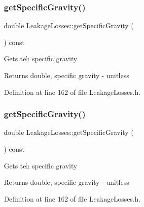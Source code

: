 \subsubsection{\texorpdfstring{get\+Specific\+Gravity()}{getSpecificGravity()}\hspace{0.1cm}{\footnotesize\ttfamily [1/3]}}
{\footnotesize\ttfamily double Leakage\+Losses\+::get\+Specific\+Gravity (\begin{DoxyParamCaption}{ }\end{DoxyParamCaption}) const\hspace{0.3cm}{\ttfamily [inline]}}

Gets teh specific gravity

\begin{DoxyReturn}{Returns}
double, specific gravity -\/ unitless 
\end{DoxyReturn}


Definition at line 162 of file Leakage\+Losses.\+h.

\mbox{\label{class_leakage_losses_a37cd8c2282547246bab395424dad51d9}} 
\subsubsection{\texorpdfstring{get\+Specific\+Gravity()}{getSpecificGravity()}\hspace{0.1cm}{\footnotesize\ttfamily [2/3]}}
{\footnotesize\ttfamily double Leakage\+Losses\+::get\+Specific\+Gravity (\begin{DoxyParamCaption}{ }\end{DoxyParamCaption}) const\hspace{0.3cm}{\ttfamily [inline]}}

Gets teh specific gravity

\begin{DoxyReturn}{Returns}
double, specific gravity -\/ unitless 
\end{DoxyReturn}


Definition at line 162 of file Leakage\+Losses.\+h.

\mbox{\label{class_leakage_losses_a37cd8c2282547246bab395424dad51d9}} 
